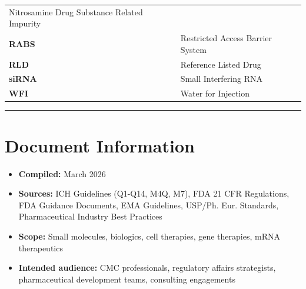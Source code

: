 \documentclass[
  11pt,
  a4paper,
]{report}
\providecommand{\tightlist}{%
  \setlength{\itemsep}{0pt}\setlength{\parskip}{0pt}}
\begin{document}
\begin{longtable}[]{@{}ll@{}}
\begin{minipage}[t]{0.61\columnwidth}
Nitrosamine Drug Substance Related Impurity\strut
\end{minipage}\tabularnewline
\begin{minipage}[t]{0.33\columnwidth}\raggedright
\textbf{RABS}\strut
\end{minipage} & \begin{minipage}[t]{0.61\columnwidth}\raggedright
Restricted Access Barrier System\strut
\end{minipage}\tabularnewline
\begin{minipage}[t]{0.33\columnwidth}\raggedright
\textbf{RLD}\strut
\end{minipage} & \begin{minipage}[t]{0.61\columnwidth}\raggedright
Reference Listed Drug\strut
\end{minipage}\tabularnewline
\begin{minipage}[t]{0.33\columnwidth}\raggedright
\textbf{siRNA}\strut
\end{minipage} & \begin{minipage}[t]{0.61\columnwidth}\raggedright
Small Interfering RNA\strut
\end{minipage}\tabularnewline
\begin{minipage}[t]{0.33\columnwidth}\raggedright
\textbf{WFI}\strut
\end{minipage} & \begin{minipage}[t]{0.61\columnwidth}\raggedright
Water for Injection\strut
\end{minipage}\tabularnewline
\bottomrule
\end{longtable}

\begin{center}\rule{0.5\linewidth}{0.5pt}\end{center}

\hypertarget{document-information}{%
\section{Document Information}\label{document-information}}

\begin{itemize}
\tightlist
\item
  \textbf{Compiled:} March 2026
\item
  \textbf{Sources:} ICH Guidelines (Q1-Q14, M4Q, M7), FDA 21 CFR
  Regulations, FDA Guidance Documents, EMA Guidelines, USP/Ph. Eur.
  Standards, Pharmaceutical Industry Best Practices
\item
  \textbf{Scope:} Small molecules, biologics, cell therapies, gene
  therapies, mRNA therapeutics
\item
  \textbf{Intended audience:} CMC professionals, regulatory affairs
  strategists, pharmaceutical development teams, consulting engagements
\end{itemize}
\end{document}
